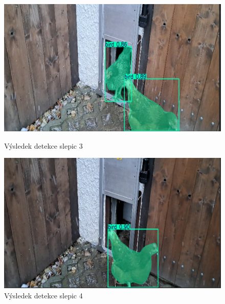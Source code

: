\begin{figure}[htbp]
    \begin{minipage}[b]{0.45\textwidth}
        \centering
        \includegraphics[width=\textwidth]{img/chicken_detection3}
        \caption{Výsledek detekce slepic 3}
        \label{fig:chicken_detection3}
    \end{minipage}
    \hfill
    \begin{minipage}[b]{0.45\textwidth}
        \centering
        \includegraphics[width=\textwidth]{img/chicken_detection4}
        \caption{Výsledek detekce slepic 4}
        \label{fig:chicken_detection4}
    \end{minipage}
\end{figure}

